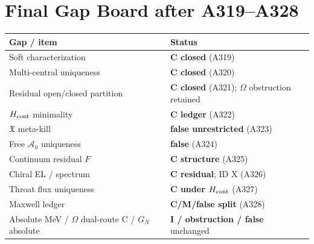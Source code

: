 \section*{Final Gap Board after A319--A328}
\begin{center}
\begin{tabular}{@{}p{5.2cm}p{7.0cm}@{}}
\toprule
Gap / item & Status \\
\midrule
Soft characterization & \textbf{C closed} (A319) \\
Multi-central uniqueness & \textbf{C closed} (A320) \\
Residual open/closed partition & \textbf{C closed} (A321); $\Omega$ obstruction retained \\
$H_{\rm cont}$ minimality & \textbf{C ledger} (A322) \\
$\mathfrak{X}$ meta-kill & \textbf{false unrestricted} (A323) \\
Free $\mathcal{A}_0$ uniqueness & \textbf{false} (A324) \\
Continuum residual $F$ & \textbf{C structure} (A325) \\
Chiral EL / spectrum & \textbf{C residual}; ID X (A326) \\
Throat flux uniqueness & \textbf{C under $H_{\rm cont}$} (A327) \\
Maxwell ledger & \textbf{C/M/false split} (A328) \\
Absolute MeV / $\Omega$ dual-route C / $G_N$ absolute & \textbf{I / obstruction / false} unchanged \\
\bottomrule
\end{tabular}
\end{center}
